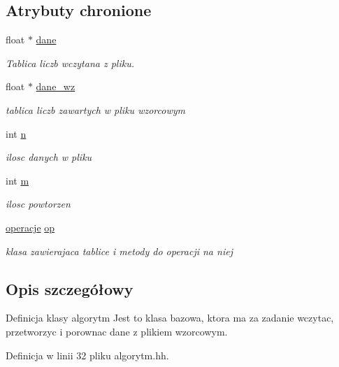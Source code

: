 \subsection*{\-Atrybuty chronione}
\begin{DoxyCompactItemize}
\item 
float $\ast$ \hyperlink{classalgorytm_a5dd6d510b611002cfb9737f12eeff63f}{dane}
\begin{DoxyCompactList}\small\item\em \-Tablica liczb wczytana z pliku. \end{DoxyCompactList}\item 
float $\ast$ \hyperlink{classalgorytm_a93fb0f7a64eb1e4f8492445395f98e5f}{dane\-\_\-wz}
\begin{DoxyCompactList}\small\item\em tablica liczb zawartych w pliku wzorcowym \end{DoxyCompactList}\item 
int \hyperlink{classalgorytm_a2778c37f0ec06a30b7d494501c40e91a}{n}
\begin{DoxyCompactList}\small\item\em ilosc danych w pliku \end{DoxyCompactList}\item 
int \hyperlink{classalgorytm_ac9429e88b0630a008df4d011458ee5a2}{m}
\begin{DoxyCompactList}\small\item\em ilosc powtorzen \end{DoxyCompactList}\item 
\hyperlink{classoperacje}{operacje} \hyperlink{classalgorytm_aedaee1aa41206b5f050fe660d0846f2d}{op}
\begin{DoxyCompactList}\small\item\em klasa zawierajaca tablice i metody do operacji na niej \end{DoxyCompactList}\end{DoxyCompactItemize}


\subsection{\-Opis szczegółowy}
\-Definicja klasy algorytm \-Jest to klasa bazowa, ktora ma za zadanie wczytac, przetworzyc i porownac dane z plikiem wzorcowym. 

\-Definicja w linii 32 pliku algorytm.\-hh.



